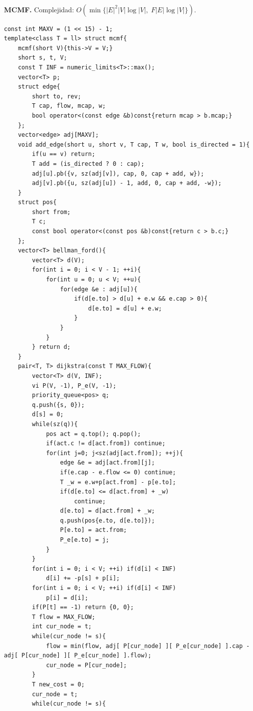 \documentclass[10pt,spanish,mexico]{article}
\numberwithin{equation}{section}
\begin{document}
\begin{multicols}{2}
\vspace{-1.2\baselineskip}
\hrulefill\\
\textbf{MCMF.} Complejidad: $O(\min\{|E|^2|V|\log |V|, \; F|E|\log |V|\}).$
\begin{verbatim}
const int MAXV = (1 << 15) - 1;
template<class T = ll> struct mcmf{
    mcmf(short V){this->V = V;}
    short s, t, V;
    const T INF = numeric_limits<T>::max();
    vector<T> p;
    struct edge{
        short to, rev;
        T cap, flow, mcap, w;
        bool operator<(const edge &b)const{return mcap > b.mcap;}
    };
    vector<edge> adj[MAXV];
    void add_edge(short u, short v, T cap, T w, bool is_directed = 1){
        if(u == v) return;
        T add = (is_directed ? 0 : cap);
        adj[u].pb({v, sz(adj[v]), cap, 0, cap + add, w});
        adj[v].pb({u, sz(adj[u]) - 1, add, 0, cap + add, -w});
    }
    struct pos{
        short from;
        T c;
        const bool operator<(const pos &b)const{return c > b.c;}
    };
    vector<T> bellman_ford(){
        vector<T> d(V);
        for(int i = 0; i < V - 1; ++i){
            for(int u = 0; u < V; ++u){
                for(edge &e : adj[u]){
                    if(d[e.to] > d[u] + e.w && e.cap > 0){
                        d[e.to] = d[u] + e.w;
                    }
                }
            }
        } return d;
    }
    pair<T, T> dijkstra(const T MAX_FLOW){
        vector<T> d(V, INF);
        vi P(V, -1), P_e(V, -1);
        priority_queue<pos> q;
        q.push({s, 0});
        d[s] = 0;
        while(sz(q)){
            pos act = q.top(); q.pop();
            if(act.c != d[act.from]) continue;
            for(int j=0; j<sz(adj[act.from]); ++j){
                edge &e = adj[act.from][j];
                if(e.cap - e.flow <= 0) continue;
                T _w = e.w+p[act.from] - p[e.to];
                if(d[e.to] <= d[act.from] + _w)
                    continue;
                d[e.to] = d[act.from] + _w;
                q.push(pos{e.to, d[e.to]});
                P[e.to] = act.from;
                P_e[e.to] = j;
            }
        }
        for(int i = 0; i < V; ++i) if(d[i] < INF)
            d[i] += -p[s] + p[i];
        for(int i = 0; i < V; ++i) if(d[i] < INF)
            p[i] = d[i];
        if(P[t] == -1) return {0, 0};
        T flow = MAX_FLOW;
        int cur_node = t;
        while(cur_node != s){
            flow = min(flow, adj[ P[cur_node] ][ P_e[cur_node] ].cap - adj[ P[cur_node] ][ P_e[cur_node] ].flow);
            cur_node = P[cur_node];
        }
        T new_cost = 0;
        cur_node = t;
        while(cur_node != s){

\end{verbatim}
\end{multicols}
\end{document}
